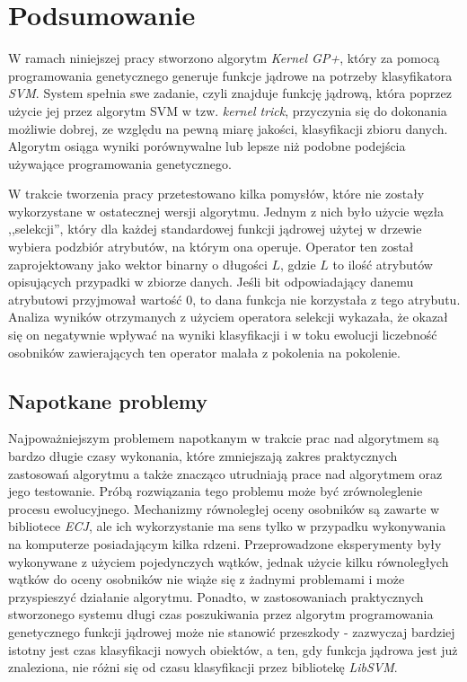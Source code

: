 \chapter{Podsumowanie}
W ramach niniejszej pracy stworzono algorytm \emph{Kernel GP+}, który za pomocą programowania genetycznego generuje funkcje jądrowe na potrzeby klasyfikatora \emph{SVM}. System spełnia swe zadanie, czyli znajduje funkcję jądrową, która poprzez użycie jej przez algorytm SVM w tzw. \emph{kernel trick}, przyczynia się do dokonania możliwie dobrej, ze względu na pewną miarę jakości, klasyfikacji zbioru danych.
Algorytm osiąga wyniki porównywalne lub lepsze niż podobne podejścia używające programowania genetycznego.

W trakcie tworzenia pracy przetestowano kilka pomysłów, które nie zostały wykorzystane w ostatecznej wersji algorytmu. Jednym z nich było użycie węzła ,,selekcji'', który dla każdej standardowej funkcji jądrowej użytej w drzewie wybiera podzbiór atrybutów, na którym ona operuje. Operator ten został zaprojektowany jako wektor binarny o długości $ L $, gdzie $ L $ to ilość atrybutów opisujących przypadki w zbiorze danych. Jeśli bit odpowiadający danemu atrybutowi przyjmował wartość 0, to dana funkcja nie korzystała z tego atrybutu. Analiza wyników otrzymanych z użyciem operatora selekcji wykazała, że okazał się on negatywnie wpływać na wyniki klasyfikacji i w toku ewolucji liczebność osobników zawierających ten operator malała z pokolenia na pokolenie.


\section{Napotkane problemy}
Najpoważniejszym problemem napotkanym w trakcie prac nad algorytmem są bardzo długie czasy wykonania, które zmniejszają zakres praktycznych zastosowań algorytmu a także znacząco utrudniają prace nad algorytmem oraz jego testowanie.
Próbą rozwiązania tego problemu może być zrównoleglenie procesu ewolucyjnego. Mechanizmy równoległej oceny osobników są zawarte w bibliotece \emph{ECJ}, ale ich wykorzystanie ma sens tylko w przypadku wykonywania na komputerze posiadającym kilka rdzeni. Przeprowadzone eksperymenty były wykonywane z użyciem pojedynczych wątków, jednak użycie kilku równoległych wątków do oceny osobników nie wiąże się z żadnymi problemami i może przyspieszyć działanie algorytmu.
Ponadto, w zastosowaniach praktycznych stworzonego systemu długi czas poszukiwania przez algorytm programowania genetycznego funkcji jądrowej może nie stanowić przeszkody - zazwyczaj bardziej istotny jest czas klasyfikacji nowych obiektów, a ten, gdy funkcja jądrowa jest już znaleziona, nie różni się od czasu klasyfikacji przez bibliotekę \emph{LibSVM}.

